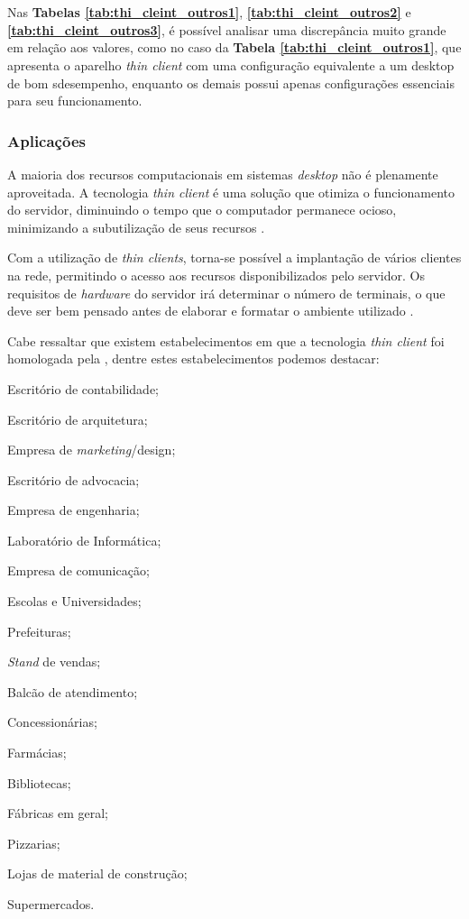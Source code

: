 \documentclass[
	12pt,				%
	openright,			%
	twoside,			%
	a4paper,			%
	chapter=TITLE,		%
	english,			%
	brazil				%
	]{abntex2}
\begin{document}
\chapter*{}
Nas \textbf{Tabelas \ref{tab:thi_cleint_outros1}}, \textbf{\ref{tab:thi_cleint_outros2}} e \textbf{\ref{tab:thi_cleint_outros3}}, é possível analisar uma discrepância muito grande em relação aos valores, como no caso da \textbf{Tabela \ref{tab:thi_cleint_outros1}}, que apresenta o aparelho \textit{thin client} com uma configuração equivalente a um desktop de bom sdesempenho, enquanto os demais possui apenas configurações essenciais para seu funcionamento.
	
\subsection{Aplicações}

A maioria dos recursos computacionais em sistemas \textit{desktop} não é plenamente aproveitada. A tecnologia \textit{thin client} é uma solução que otimiza o funcionamento do servidor, diminuindo o tempo que o computador permanece ocioso, minimizando a subutilização de seus recursos \cite{thinclientbrasil}. 

Com a utilização de \textit{thin clients}, torna-se possível a implantação de vários clientes na rede, permitindo o acesso aos recursos disponibilizados pelo servidor. Os requisitos de \textit{hardware} do servidor irá determinar o número de terminais, o que deve ser bem pensado antes de elaborar e formatar o ambiente utilizado \cite{thinclientbrasil}. 

Cabe ressaltar que existem estabelecimentos em que a tecnologia \textit{thin client} foi homologada pela , dentre estes estabelecimentos podemos destacar:


\begin{alineas}
\item Escritório de contabilidade;
\item Escritório de arquitetura;
\item Empresa de \textit{marketing}/design;
\item Escritório de advocacia;
\item Empresa de engenharia;
\item Laboratório de Informática;
\item Empresa de comunicação;
\item Escolas e Universidades;
\item Prefeituras;
\item \textit{Stand} de vendas;
\item Balcão de atendimento;
\item Concessionárias;
\item Farmácias;
\item Bibliotecas;
\item Fábricas em geral;
\item Pizzarias;
\item Lojas de material de construção;
\item Supermercados.
\end{alineas}
\end{document}
